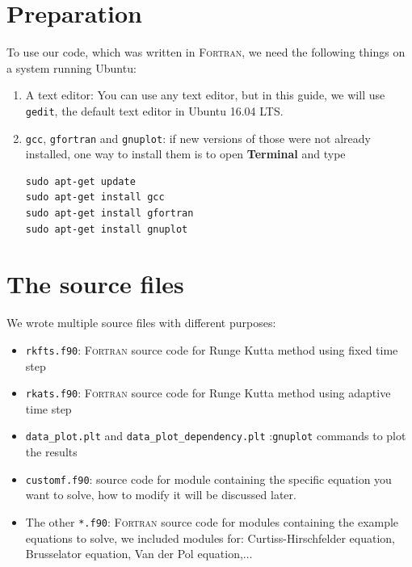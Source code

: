 \documentclass[a4paper,oneside]{book}
\numberwithin{equation}{chapter}
\begin{document}
	\section{Preparation}
	To use our code, which was written in \textsc{Fortran}, we need the following things on a system running Ubuntu:
	\begin{enumerate}
		\item A text editor: You can use any text editor, but in this guide, we will use \texttt{gedit}, the default text editor in Ubuntu 16.04 LTS.
		\item \texttt{gcc}, \texttt{gfortran} and \texttt{gnuplot}: if new versions of those were not already installed, one way to install them is to open \textbf{Terminal} and type
		\begin{lstlisting}
sudo apt-get update
sudo apt-get install gcc
sudo apt-get install gfortran
sudo apt-get install gnuplot
		\end{lstlisting}
	\end{enumerate}
	\section{The source files}
	We wrote multiple source files with different purposes:
	\begin{itemize}
		\item \texttt{rkfts.f90}: \textsc{Fortran} source code for Runge Kutta method using fixed time step
		\item \texttt{rkats.f90}: \textsc{Fortran} source code for Runge Kutta method using adaptive time step
		\item \texttt{data\_plot.plt} and \texttt{data\_plot\_dependency.plt} :\texttt{gnuplot} commands to plot the results
		\item \texttt{customf.f90}: source code for module containing the specific equation you want to solve, how to modify it will be discussed later.
		\item The other \texttt{*.f90}: \textsc{Fortran} source code for modules containing the example equations to solve, we included modules for: Curtiss-Hirschfelder equation, Brusselator equation, Van der Pol equation,$\dots$
	\end{itemize}
\end{document}
